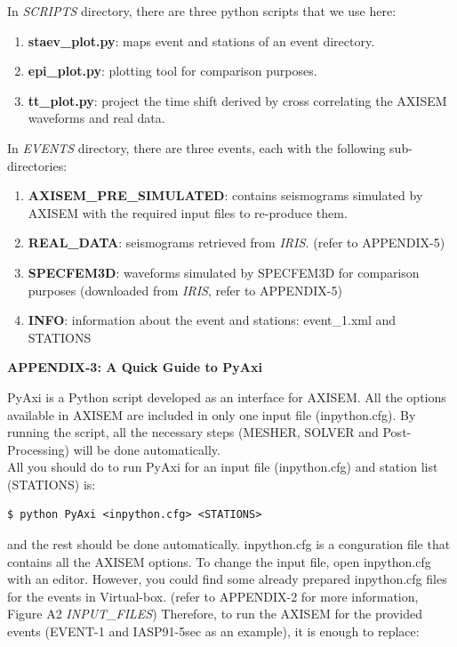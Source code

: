 \documentclass{article}
\begin{document}
In \textit{SCRIPTS} directory, there are three python scripts that we use here:

\begin{enumerate}
 \item \textbf{staev\_plot.py}: maps event and stations of an event directory.
 \item \textbf{epi\_plot.py}: plotting tool for comparison purposes.
 \item \textbf{ tt\_plot.py}: project the time shift derived by cross correlating the AXISEM waveforms and real data.
\end{enumerate}

In \textit{EVENTS} directory, there are three events, each with the following sub-directories:

\begin{enumerate}
 \item \textbf{AXISEM\_PRE\_SIMULATED}: contains seismograms simulated by AXISEM with 
the required input files to re-produce them.
 \item \textbf{REAL\_DATA}: seismograms retrieved from \textit{IRIS. }(refer to APPENDIX-5)
 \item \textbf{SPECFEM3D}: waveforms simulated by SPECFEM3D for comparison purposes 
(downloaded from\textit{ IRIS}, refer to APPENDIX-5)
 \item \textbf{INFO}: information about the event and stations: event\_1.xml and STATIONS
\end{enumerate}


\newpage
{\large{}\textbf{APPENDIX-3: A Quick Guide to PyAxi}}

PyAxi is a Python script developed as an interface for AXISEM. All the options 
available in AXISEM are included in only one input file (inpython.cfg). By running 
the script, all the necessary steps (MESHER, SOLVER and Post-Processing) will be 
done automatically. \\

All you should do to run PyAxi for an input file (inpython.cfg) and station list 
(STATIONS) is:
\begin{lstlisting}
$ python PyAxi <inpython.cfg> <STATIONS>
\end{lstlisting}

and the rest should be done automatically. inpython.cfg is a conguration file that 
contains all the AXISEM options. To change the input file, open inpython.cfg with 
an editor. However, you could find some already prepared inpython.cfg files for 
the events in Virtual-box. (refer to APPENDIX-2 for more information, Figure A2 
\textit{INPUT\_FILES}) Therefore, to run the AXISEM for the provided events (EVENT-1 
and IASP91-5sec as an example), it is enough to replace:
\end{document}
